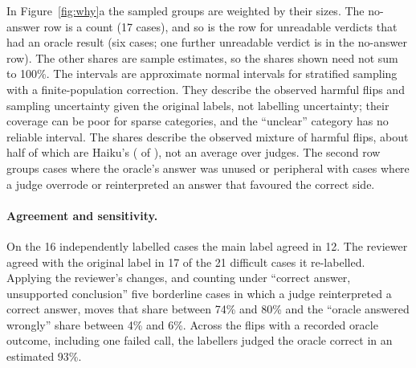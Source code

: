 In Figure~\ref{fig:why}a the sampled groups are weighted by their sizes. The no-answer row is a count (17 cases), and
so is the row for unreadable verdicts that had an oracle result (six cases; one further unreadable verdict is in the
no-answer row). The other shares are sample estimates, so the shares shown need not sum to 100\%. The intervals are
approximate normal intervals for stratified sampling with a finite-population correction. They describe the
\nHarm{} observed harmful flips and sampling uncertainty given the original labels, not labelling uncertainty; their
coverage can be poor for sparse categories, and the ``unclear'' category has no reliable interval. The shares
describe the observed mixture of harmful flips, about half of which are Haiku's (\haikuHarm{} of \nHarm), not an
average over judges. The second row groups cases where the oracle's answer was unused or peripheral with
cases where a judge overrode or reinterpreted an answer that favoured the correct side.

\paragraph{Agreement and sensitivity.} On the 16 independently labelled cases the main label agreed in 12. The
reviewer agreed with the original label in 17 of the 21 difficult cases it re-labelled. Applying the reviewer's
changes, and counting under ``correct answer, unsupported conclusion'' five borderline cases in which a judge
reinterpreted a correct answer, moves that share between 74\% and 80\% and the ``oracle answered wrongly'' share
between 4\% and 6\%. Across the \nAnsweredFlips{} flips with a recorded oracle outcome, including one failed call, the labellers
judged the oracle correct in an estimated 93\%.

